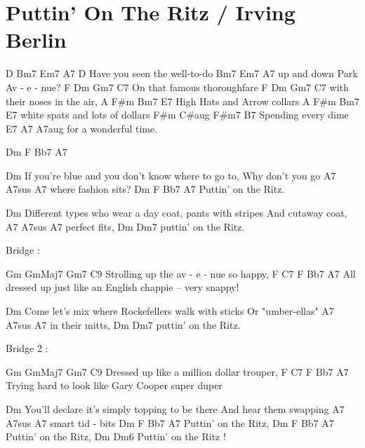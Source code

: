 \section{Puttin' On The Ritz / Irving Berlin}\label{sec:puttinontheritz}

\CaddNine
\DsusFour
\EminorSeven
\Gmajor

D        Bm7     Em7     A7 D    
Have you seen the well-to-do 
  Bm7                    Em7      A7
up and down Park Av - e - nue?
F            Dm    Gm7          C7   
On that famous thoroughfare 
F            Dm    Gm7      C7  
with their noses in the air,
A            F#m        Bm7    E7  
High    Hats and Arrow collars    
A          F#m          Bm7    E7
   white spats and lots of dollars
F#m      C#aug F#m7 B7 
Spending every dime 
E7                      A7 A7aug
for a wonderful time.


Dm   F   Bb7   A7

Dm           
If you're blue 
and you don't know 
where to go to, 
Why don't you go 
                       A7     A7sus     A7
where fashion sits?    
                      Dm   F   Bb7   A7
Puttin' on the Ritz.

Dm                   
Different types 
who wear a day coat, 
pants with stripes
And cutaway coat, 
             A7     A7sus     A7
perfect fits,         
                      Dm   Dm7
puttin' on the Ritz.

Bridge :

Gm                        GmMaj7         Gm7     C9
Strolling up the av - e - nue so happy,
F                      C7                          F               Bb7   A7
All dressed up just like an English chappie -- very snappy!

Dm         
Come let's mix where
Rockefellers 
walk with sticks
Or "umber-ellas"
               A7     A7sus     A7
 in their mitts,    
                       Dm   Dm7
puttin' on the Ritz.

Bridge 2 :

Gm                        GmMaj7         Gm7     C9
Dressed up like a million dollar trouper,
F                      C7                  F               Bb7   A7
Trying hard to look like Gary Cooper super duper

Dm        
You'll declare it's 
simply topping 
to be there  And 
hear them swapping 
                  A7     A7sus     A7
smart tid - bits 
                         Dm   F  Bb7  A7
Puttin' on the Ritz,
                         Dm   F  Bb7  A7
Puttin' on the Ritz,
                       Dm      Dm6
Puttin' on the Ritz !    

